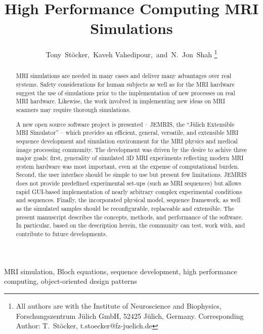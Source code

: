 \documentclass[journal,onecolumn,12pt]{IEEEtran}
\begin{document}
\title{High Performance Computing {MRI} Simulations}

\author{Tony~St\"ocker,~Kaveh Vahedipour,~and~N.~Jon~Shah
\thanks{All authors are with the Institute of Neuroscience and Biophysics,
        Forschungszentrum J\"ulich GmbH, 52425 J\"ulich, Germany.
	Corresponding Author: T.~St\"ocker, t.stoecker@fz-juelich.de}}

\maketitle

\begin{abstract}
MRI simulations are needed in many cases and deliver many advantages over real systems. Safety considerations for human
subjects as well as for the MRI hardware suggest the use of simulations prior to the implementation of new processes on
real MRI hardware. Likewise, the work involved in implementing new ideas on MRI scanners may require thorough
simulations.

A new open source software project is presented -- JEMRIS, the ``J\"ulich Extensible MRI Simulator'' -- which provides
an efficient, general, versatile, and extensible MRI sequence development and simulation environment for the MRI physics
and medical image processing community. The development was driven by the desire to achive three major goals: first,
generality of simulated 3D MRI experiments reflecting modern MRI system hardware was most important, even at the expense
of computational burden. Second, the user interface should be simple to use but present few limitations. JEMRIS
does not provide predefined experimental set-ups (such as MRI sequences) but allows rapid GUI-based implementation of
nearly arbitrary complex experimental conditions and sequences. Finally, the incorporated physical model, sequence
framework, as well as the simulated samples should be reconfigurable, replaceable and extensible. The present manuscript
describes the concepts, methods, and performance of the software. In particular, based on the description herein, the
community can test, work with, and contribute to future developments.

\end{abstract}

\begin{keywords}
MRI simulation, Bloch equations, sequence development, high performance computing,
object-oriented design patterns
\end{keywords}
\end{document}
